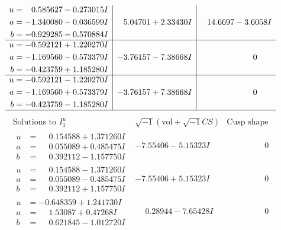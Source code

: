 \documentclass[1p]{elsarticle_modified}
\theoremstyle{definition}
\newcommand{\I}{\sqrt{-1}}
\begin{document}
$$\begin{array}{c|c|c}
\begin{aligned}
u &= \phantom{-}0.585627 - 0.273015 I \\
a &= -1.340080 - 0.036599 I \\
b &= -0.929285 - 0.570884 I\end{aligned}
 & \phantom{-}5.04701 + 2.33430 I & \phantom{-}14.6697 - 3.6058 I \\ \hline\begin{aligned}
u &= -0.592121 + 1.220270 I \\
a &= -1.169560 - 0.573379 I \\
b &= -0.423759 + 1.185280 I\end{aligned}
 & -3.76157 - 7.38668 I & \phantom{-0.000000 } 0 \\ \hline\begin{aligned}
u &= -0.592121 - 1.220270 I \\
a &= -1.169560 + 0.573379 I \\
b &= -0.423759 - 1.185280 I\end{aligned}
 & -3.76157 + 7.38668 I & \phantom{-0.000000 } 0\\
 \hline 
 \end{array}$$\newpage$$\begin{array}{c|c|c}  
\text{Solutions to }I^u_{1}& \I (\text{vol} + \sqrt{-1}CS) & \text{Cusp shape}\\
 \hline 
\begin{aligned}
u &= \phantom{-}0.154588 + 1.371260 I \\
a &= \phantom{-}0.055089 + 0.485475 I \\
b &= \phantom{-}0.392112 - 1.157750 I\end{aligned}
 & -7.55406 - 5.15323 I & \phantom{-0.000000 } 0 \\ \hline\begin{aligned}
u &= \phantom{-}0.154588 - 1.371260 I \\
a &= \phantom{-}0.055089 - 0.485475 I \\
b &= \phantom{-}0.392112 + 1.157750 I\end{aligned}
 & -7.55406 + 5.15323 I & \phantom{-0.000000 } 0 \\ \hline\begin{aligned}
u &= -0.648359 + 1.241730 I \\
a &= \phantom{-}1.53087 + 0.47268 I \\
b &= \phantom{-}0.621845 - 1.012720 I\end{aligned}
 & \phantom{-}0.28944 - 7.65428 I & \phantom{-0.000000 } 0 \\ \hline\begin{aligned}

\end{aligned}
\end{array}$$
\end{document}
